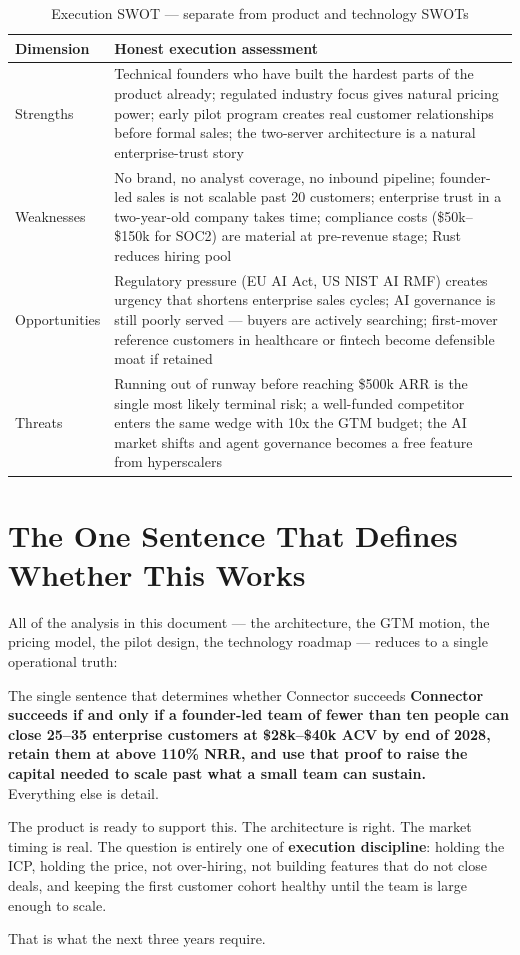 \begin{table}[H]
\centering
\renewcommand{\arraystretch}{1.45}
\begin{tabularx}{\textwidth}{@{}lX@{}}
\toprule
\textbf{Dimension} & \textbf{Honest execution assessment} \\
\midrule
Strengths & Technical founders who have built the hardest parts of the product already; regulated industry focus gives natural pricing power; early pilot program creates real customer relationships before formal sales; the two-server architecture is a natural enterprise-trust story \\
Weaknesses & No brand, no analyst coverage, no inbound pipeline; founder-led sales is not scalable past 20 customers; enterprise trust in a two-year-old company takes time; compliance costs (\$50k--\$150k for SOC2) are material at pre-revenue stage; Rust reduces hiring pool \\
Opportunities & Regulatory pressure (EU AI Act, US NIST AI RMF) creates urgency that shortens enterprise sales cycles; AI governance is still poorly served — buyers are actively searching; first-mover reference customers in healthcare or fintech become defensible moat if retained \\
Threats & Running out of runway before reaching \$500k ARR is the single most likely terminal risk; a well-funded competitor enters the same wedge with 10x the GTM budget; the AI market shifts and agent governance becomes a free feature from hyperscalers \\
\bottomrule
\end{tabularx}
\caption{Execution SWOT — separate from product and technology SWOTs}
\end{table}

\section{The One Sentence That Defines Whether This Works}

All of the analysis in this document — the architecture, the GTM motion, the
pricing model, the pilot design, the technology roadmap — reduces to a single
operational truth:

\begin{conceptbox}{The single sentence that determines whether Connector succeeds}
\centering
\textbf{Connector succeeds if and only if a founder-led team of fewer than ten
people can close 25--35 enterprise customers at \$28k--\$40k ACV by end of 2028,
retain them at above 110\% NRR, and use that proof to raise the capital needed
to scale past what a small team can sustain.}\\[6pt]
Everything else is detail.
\end{conceptbox}

The product is ready to support this. The architecture is right. The market
timing is real. The question is entirely one of \textbf{execution discipline}:
holding the ICP, holding the price, not over-hiring, not building features that
do not close deals, and keeping the first customer cohort healthy until the team
is large enough to scale.

That is what the next three years require.
